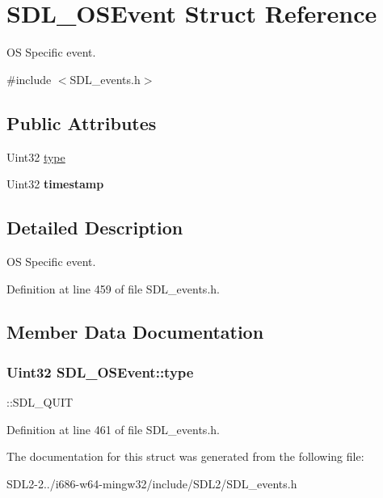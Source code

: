 \hypertarget{structSDL__OSEvent}{\section{S\+D\+L\+\_\+\+O\+S\+Event Struct Reference}
\label{structSDL__OSEvent}
}


O\+S Specific event.  




{\ttfamily \#include $<$S\+D\+L\+\_\+events.\+h$>$}

\subsection*{Public Attributes}
\begin{DoxyCompactItemize}
\item 
Uint32 \hyperlink{structSDL__OSEvent_a85a600619ebebc8db007fc757b3895a5}{type}
\item 
\hypertarget{structSDL__OSEvent_a8b2480eefadad9f3f8c94f8e550b7fb0}{Uint32 {\bfseries timestamp}}\label{structSDL__OSEvent_a8b2480eefadad9f3f8c94f8e550b7fb0}

\end{DoxyCompactItemize}


\subsection{Detailed Description}
O\+S Specific event. 

Definition at line 459 of file S\+D\+L\+\_\+events.\+h.



\subsection{Member Data Documentation}
\hypertarget{structSDL__OSEvent_a85a600619ebebc8db007fc757b3895a5}{
\subsubsection[{type}]{\setlength{\rightskip}{0pt plus 5cm}Uint32 S\+D\+L\+\_\+\+O\+S\+Event\+::type}}\label{structSDL__OSEvent_a85a600619ebebc8db007fc757b3895a5}
\+::\+S\+D\+L\+\_\+\+Q\+U\+I\+T 

Definition at line 461 of file S\+D\+L\+\_\+events.\+h.



The documentation for this struct was generated from the following file\+:\begin{DoxyCompactItemize}
\item 
S\+D\+L2-\/2../i686-\/w64-\/mingw32/include/\+S\+D\+L2/S\+D\+L\+\_\+events.\+h\end{DoxyCompactItemize}
